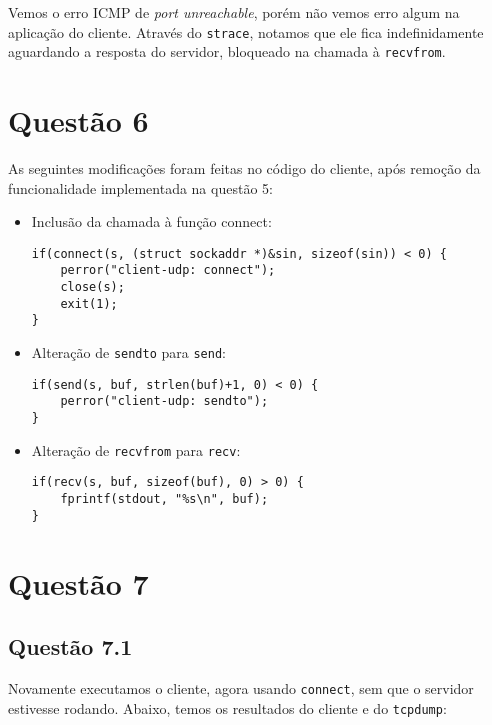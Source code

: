 \documentclass[a4paper,10pt]{article}
\begin{document}
Vemos o erro ICMP de \textit{port unreachable}, porém não vemos erro algum na aplicação do cliente. Através do {\tt strace}, notamos que ele fica indefinidamente aguardando a resposta do servidor, bloqueado na chamada à {\tt recvfrom}.

\section{Questão 6}

As seguintes modificações foram feitas no código do cliente, após remoção da funcionalidade implementada na questão 5:

\begin{itemize}

\item Inclusão da chamada à função connect:

\begin{lstlisting}
if(connect(s, (struct sockaddr *)&sin, sizeof(sin)) < 0) {
    perror("client-udp: connect");
    close(s);
    exit(1);
}
\end{lstlisting}

\item Alteração de {\tt sendto} para {\tt send}:

\begin{lstlisting}
if(send(s, buf, strlen(buf)+1, 0) < 0) {
    perror("client-udp: sendto");
}
\end{lstlisting}

\item Alteração de {\tt recvfrom} para {\tt recv}:

\begin{lstlisting}
if(recv(s, buf, sizeof(buf), 0) > 0) {
    fprintf(stdout, "%s\n", buf);
}
\end{lstlisting}

\end{itemize}

\section{Questão 7}
\subsection{Questão 7.1}
Novamente executamos o cliente, agora usando {\tt connect}, sem que o servidor estivesse rodando. Abaixo, temos os resultados do cliente e do {\tt tcpdump}:
\end{document}
